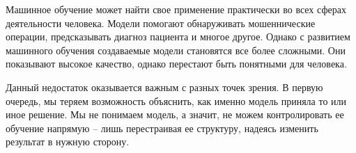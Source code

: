 Машинное обучение может найти свое применение практически во всех сферах деятельности человека. Модели помогают обнаруживать мошеннические операции, предсказывать диагноз пациента и многое другое. Однако с развитием машинного обучения создаваемые модели становятся все более сложными. Они показывают высокое качество, однако перестают быть понятными для человека.

Данный недостаток оказывается важным с разных точек зрения. В первую очередь, мы теряем возможность объяснить, как именно модель приняла то или иное решение. Мы не понимаем модель, а значит, не можем контролировать ее обучение напрямую -- лишь перестраивая ее структуру, надеясь изменить результат в нужную сторону.



